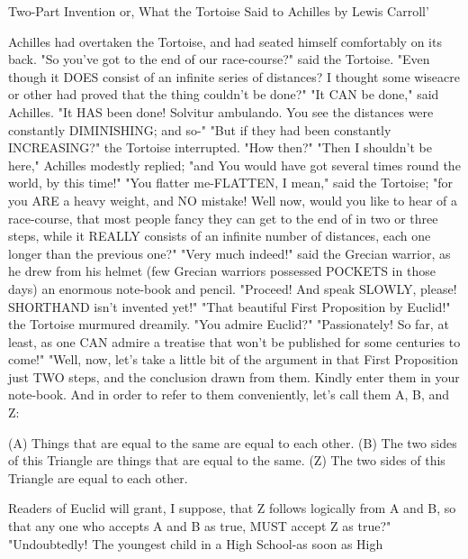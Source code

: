 Two-Part Invention or, What the Tortoise Said to Achilles by Lewis Carroll' 

Achilles had overtaken the Tortoise, and had seated himself comfortably on its back. "So you've got to the end of our race-course?" said the Tortoise. "Even though it DOES consist of an infinite series of distances? I thought some wiseacre or other had proved that the thing couldn't be done?" "It CAN be done," said Achilles. "It HAS been done! Solvitur ambulando. You see the distances were constantly DIMINISHING; and so-" "But if they had been constantly INCREASING?" the Tortoise interrupted. "How then?" "Then I shouldn't be here," Achilles modestly replied; "and You would have got several times round the world, by this time!" "You flatter me-FLATTEN, I mean," said the Tortoise; "for you ARE a heavy weight, and NO mistake! Well now, would you like to hear of a race-course, that most people fancy they can get to the end of in two or three steps, while it REALLY consists of an infinite number of distances, each one longer than the previous one?" "Very much indeed!" said the Grecian warrior, as he drew from his helmet (few Grecian warriors possessed POCKETS in those days) an enormous note-book and pencil. "Proceed! And speak SLOWLY, please! SHORTHAND isn't invented yet!" "That beautiful First Proposition by Euclid!" the Tortoise murmured dreamily. "You admire Euclid?" "Passionately! So far, at least, as one CAN admire a treatise that won't be published for some centuries to come!" "Well, now, let's take a little bit of the argument in that First Proposition just TWO steps, and the conclusion drawn from them. Kindly enter them in your note-book. And in order to refer to them conveniently, let's call them A, B, and Z: 

(A) Things that are equal to the same are equal to each other. (B) The two sides of this Triangle are things that are equal to the same. (Z) The two sides of this Triangle are equal to each other. 

Readers of Euclid will grant, I suppose, that Z follows logically from A and B, so that any one who accepts A and B as true, MUST accept Z as true?" "Undoubtedly! The youngest child in a High School-as soon as High 








